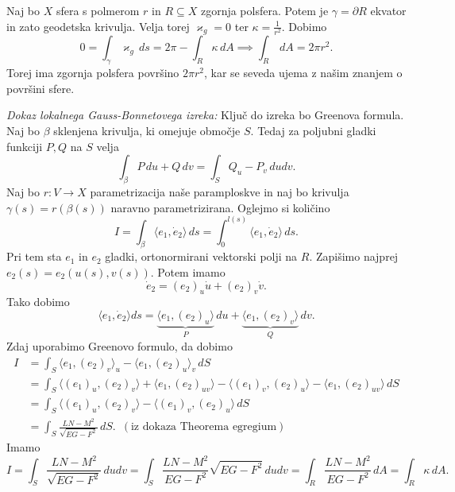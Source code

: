 \begin{primer}
    Naj bo $X$ sfera s polmerom $r$ in $R \subseteq  X$ zgornja polsfera. Potem je $\gamma = \partial R$ ekvator in zato geodetska krivulja. Velja torej $\varkappa_g = 0$ ter $\kappa = \frac{1}{r^2}$. Dobimo \begin{equation*}
    0 = \int_{\gamma} \varkappa_g  \, ds = 2 \pi - \int_{R} \kappa  \, dA \implies \int_{R}  \, dA =  2 \pi r^2.
    \end{equation*}  
    Torej ima zgornja polsfera površino $2 \pi r^2$, kar se seveda ujema z našim znanjem o površini sfere.
\end{primer}

\noindent
{\em Dokaz lokalnega Gauss-Bonnetovega izreka:\/}
Ključ do izreka bo Greenova formula. Naj bo $\beta$ sklenjena krivulja, ki omejuje območje $S$. Tedaj za poljubni gladki funkciji $P, Q$ na $S$ velja \begin{equation*}
\int_{\beta} P \, du  + Q \, dv = \int_{S} Q_u - P_v \, du dv.
\end{equation*}  
Naj bo $r: V \to  X$ parametrizacija naše paramploskve in naj bo krivulja $\gamma(s) = r(\beta(s))$ naravno parametrizirana. Oglejmo si količino \begin{equation*}
I = \int_{\beta} \langle e_1, \dot{e}_2 \rangle   \, ds = \int_{0}^{l(s)}  \langle e_1, \dot{e}_2 \rangle   \, ds .
\end{equation*}  
Pri tem sta  $e_1$ in $e_2$ gladki, ortonormirani vektorski polji na $R$. Zapišimo najprej $e_2(s) = e_2(u(s), v(s))$. Potem imamo \begin{equation*}
\dot{e}_2 = (e_2)_u \dot{u} + (e_2)_v \dot{v}.
\end{equation*}  
Tako dobimo \begin{equation*}
\langle e_1, \dot{e}_2 \rangle ds  = \underbrace{\langle e_1, (e_2)_u \rangle}_P  \, du +  \underbrace{\langle e_1, (e_2)_v \rangle}_Q  \, dv.
\end{equation*}  
Zdaj uporabimo Greenovo formulo, da dobimo \begin{align*}
    I &= \int_{S} \langle e_1, (e_2)_v \rangle_u - \langle e_1, (e_2)_u \rangle_v   \, dS  \\
     &= \int_{S} \langle (e_1)_u, (e_2)_v \rangle + \langle e_1, (e_2)_{uv} \rangle - \langle (e_1)_v, (e_2)_u \rangle   - \langle e_1, (e_2)_{uv} \rangle \, dS \\
     &=  \int_{S} \langle (e_1)_u, (e_2)_v \rangle - \langle (e_1)_v, (e_2)_u \rangle  \, dS \\
     &= \int_{S} \frac{LN - M^2}{\sqrt{EG - F^2} }  \, dS. \,\,\,(\text{iz dokaza Theorema egregium})
\end{align*}
Imamo \begin{equation*}
I = \int_{S} \frac{LN - M^2}{\sqrt{EG - F^2} }  \, du dv =  \int_{S} \frac{LN - M^2}{EG - F^2} \sqrt{EG - F^2}  \, du dv = \int_{R} \frac{LN - M^2}{EG - F^2} \, dA = \int_{R} \kappa \, dA.
\end{equation*}  

